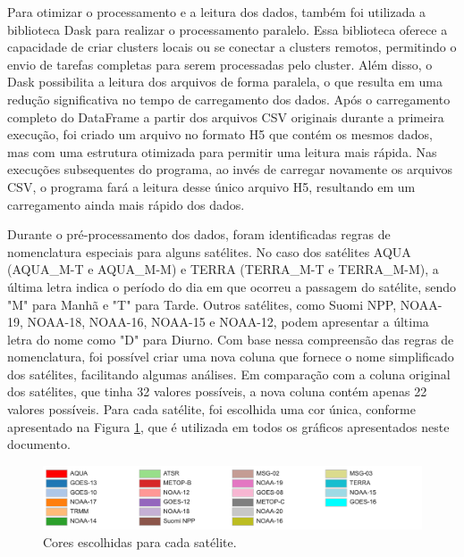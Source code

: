 \documentclass[cic,tc]{iiufrgs}
\begin{document}
Para otimizar o processamento e a leitura dos dados, também foi utilizada a biblioteca Dask para realizar o processamento paralelo. Essa biblioteca oferece a capacidade de criar clusters locais ou se conectar a clusters remotos, permitindo o envio de tarefas completas para serem processadas pelo cluster. Além disso, o Dask possibilita a leitura dos arquivos de forma paralela, o que resulta em uma redução significativa no tempo de carregamento dos dados. Após o carregamento completo do DataFrame a partir dos arquivos CSV originais durante a primeira execução, foi criado um arquivo no formato H5 que contém os mesmos dados, mas com uma estrutura otimizada para permitir uma leitura mais rápida. Nas execuções subsequentes do programa, ao invés de carregar novamente os arquivos CSV, o programa fará a leitura desse único arquivo H5, resultando em um carregamento ainda mais rápido dos dados.  \par

Durante o pré-processamento dos dados, foram identificadas regras de nomenclatura especiais para alguns satélites. No caso dos satélites AQUA (AQUA\_M-T e AQUA\_M-M) e TERRA (TERRA\_M-T e TERRA\_M-M), a última letra indica o período do dia em que ocorreu a passagem do satélite, sendo "M" para Manhã e "T" para Tarde. Outros satélites, como Suomi NPP, NOAA-19, NOAA-18, NOAA-16, NOAA-15 e NOAA-12, podem apresentar a última letra do nome como "D" para Diurno. Com base nessa compreensão das regras de nomenclatura, foi possível criar uma nova coluna que fornece o nome simplificado dos satélites, facilitando algumas análises. Em comparação com a coluna original dos satélites, que tinha 32 valores possíveis, a nova coluna contém apenas 22 valores possíveis. Para cada satélite, foi escolhida uma cor única, conforme apresentado na Figura \ref{fig:cores_satelites}, que é utilizada em todos os gráficos apresentados neste documento. \par

\begin{figure}[H]
    \caption{Cores escolhidas para cada satélite.}
    \begin{center}
        \includegraphics[width=35em]{cores_satelites}
    \end{center}
    \label{fig:cores_satelites}
\end{figure}
\end{document}
